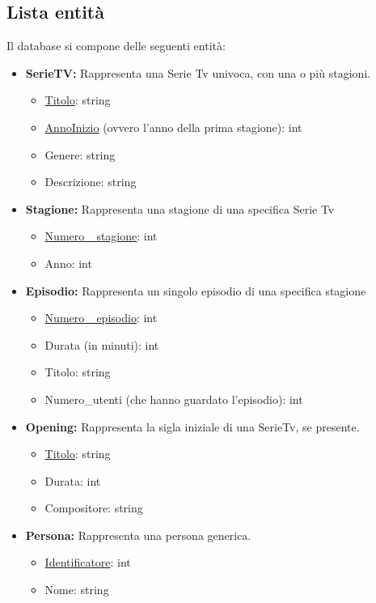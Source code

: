 \documentclass[12pt,a4paper]{article}
\begin{document}
\subsection{Lista entità}
Il database si compone delle seguenti entità:
\begin{itemize}
    \item \textbf{SerieTV:} Rappresenta una Serie Tv univoca, con una o più stagioni.
    \begin{itemize}
        \item \underline{Titolo}: string
        \item \underline{AnnoInizio} (ovvero l'anno della prima stagione): int
        \item Genere: string
        \item Descrizione: string
    \end{itemize}
    \item \textbf{Stagione:} Rappresenta una stagione di una specifica Serie Tv
    \begin{itemize}
        \item \underline{Numero\_ stagione}: int
        \item Anno: int
    \end{itemize}
    \item \textbf{Episodio:} Rappresenta un singolo episodio di una specifica stagione
    \begin{itemize}
        \item \underline{Numero\_ episodio}: int
        \item Durata (in minuti): int
        \item Titolo: string
        \item Numero\_utenti (che hanno guardato l'episodio): int
    \end{itemize}
    \item \textbf{Opening:} Rappresenta la sigla iniziale di una SerieTv, se presente.
    \begin{itemize}
        \item \underline{Titolo}: string
        \item Durata: int
        \item Compositore: string
    \end{itemize}
    \item \textbf{Persona:} Rappresenta una persona generica.
    \begin{itemize}
        \item \underline{Identificatore}: int
        \item Nome: string

\end{itemize}
\end{itemize}
\end{document}
